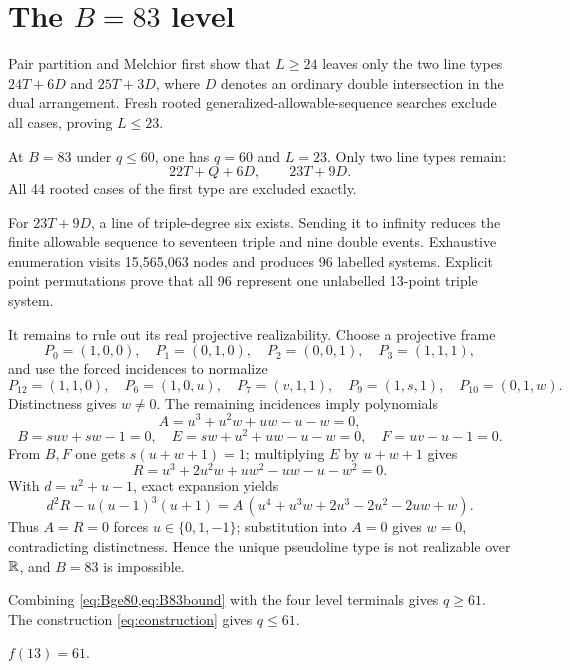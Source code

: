 \section{The $B=83$ level}

Pair partition and Melchior first show that $L\ge24$ leaves only the two line types $24T+6D$ and $25T+3D$, where $D$ denotes an ordinary double intersection in the dual arrangement.  Fresh rooted generalized-allowable-sequence searches exclude all cases, proving $L\le23$.

At $B=83$ under $q\le60$, one has $q=60$ and $L=23$.  Only two line types remain:
\[
 22T+Q+6D,
 \qquad
 23T+9D.
\]
All 44 rooted cases of the first type are excluded exactly.

For $23T+9D$, a line of triple-degree six exists.  Sending it to infinity reduces the finite allowable sequence to seventeen triple and nine double events.  Exhaustive enumeration visits 15,565,063 nodes and produces 96 labelled systems.  Explicit point permutations prove that all 96 represent one unlabelled 13-point triple system.

It remains to rule out its real projective realizability.  Choose a projective frame
\[
 P_0=(1,0,0),\quad P_1=(0,1,0),\quad P_2=(0,0,1),\quad P_3=(1,1,1),
\]
and use the forced incidences to normalize
\[
 P_{12}=(1,1,0),\quad P_6=(1,0,u),\quad P_7=(v,1,1),
 \quad P_9=(1,s,1),\quad P_{10}=(0,1,w).
\]
Distinctness gives $w\ne0$.  The remaining incidences imply polynomials
\[
 A=u^3+u^2w+uw-u-w=0,
\]
\[
 B=suv+sw-1=0,
 \quad E=sw+u^2+uw-u-w=0,
 \quad F=uv-u-1=0.
\]
From $B,F$ one gets $s(u+w+1)=1$; multiplying $E$ by $u+w+1$ gives
\[
 R=u^3+2u^2w+uw^2-uw-u-w^2=0.
\]
With $d=u^2+u-1$, exact expansion yields
\[
 d^2R-u(u-1)^3(u+1)
 =A\,(u^4+u^3w+2u^3-2u^2-2uw+w).
\]
Thus $A=R=0$ forces $u\in\{0,1,-1\}$; substitution into $A=0$ gives $w=0$, contradicting distinctness.  Hence the unique pseudoline type is not realizable over $\mathbb R$, and $B=83$ is impossible.

Combining \cref{eq:Bge80,eq:B83bound} with the four level terminals gives $q\ge61$.  The construction \cref{eq:construction} gives $q\le61$.

\begin{theorem}\label{thm:n13}
$f(13)=61$.
\end{theorem}

